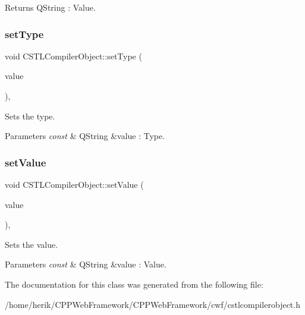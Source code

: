 \begin{DoxyReturn}{Returns}
Q\+String \+: Value. 
\end{DoxyReturn}
\mbox{\label{class_c_s_t_l_compiler_object_a16ec55cd3515f6d72c79c565bcad9243}} 
\subsubsection{\texorpdfstring{set\+Type}{setType}}
{\footnotesize\ttfamily void C\+S\+T\+L\+Compiler\+Object\+::set\+Type (\begin{DoxyParamCaption}\item[{const Q\+String \&}]{value }\end{DoxyParamCaption})\hspace{0.3cm}{\ttfamily [inline]}, {\ttfamily [slot]}}



Sets the type. 


\begin{DoxyParams}{Parameters}
{\em const} & Q\+String \&value \+: Type. \\
\hline
\end{DoxyParams}
\mbox{\label{class_c_s_t_l_compiler_object_ab32dd59c381d9fbf7d2ce58226c4f93a}} 
\subsubsection{\texorpdfstring{set\+Value}{setValue}}
{\footnotesize\ttfamily void C\+S\+T\+L\+Compiler\+Object\+::set\+Value (\begin{DoxyParamCaption}\item[{const Q\+String \&}]{value }\end{DoxyParamCaption})\hspace{0.3cm}{\ttfamily [inline]}, {\ttfamily [slot]}}



Sets the value. 


\begin{DoxyParams}{Parameters}
{\em const} & Q\+String \&value \+: Value. \\
\hline
\end{DoxyParams}


The documentation for this class was generated from the following file\+:\begin{DoxyCompactItemize}
\item 
/home/herik/\+C\+P\+P\+Web\+Framework/\+C\+P\+P\+Web\+Framework/cwf/cstlcompilerobject.\+h\end{DoxyCompactItemize}
